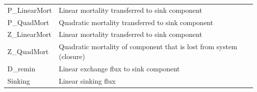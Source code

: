 \documentclass[journal abbreviations, manuscript]{copernicus}
\begin{document}
\begin{table}[t]
\begin{tabular}{l l}
P\_LinearMort & Linear mortality transferred to sink component  \\
P\_QuadMort & Quadratic mortality transferred to sink component \\
Z\_LinearMort & Linear mortality transferred to sink component \\
Z\_QuadMort & Quadratic mortality of component that is lost from system (closure) \\

D\_remin & Linear exchange flux to sink component \\
Sinking & Linear sinking flux \\
\end{tabular}
\label{Table:UseCase1PhysEnv}
\end{table}
%
\end{document}
